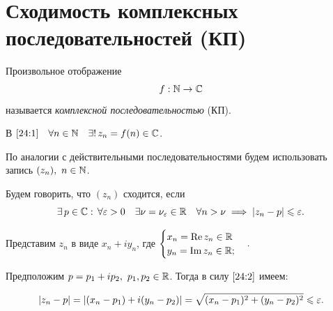 \documentclass[../../main.tex]{subfiles}
\begin{document}
\section{Сходимость комплексных последовательностей (КП)}

Произвольное отображение
\begin{equation}\label{24:1}
f: \mathbb{N} \to \mathbb{C}
\end{equation}
называется \emph{комплексной последовательностью} (КП).

В $ \eqref{24:1} \quad \forall n \in \mathbb{N} \quad \exists!\, z_n = f(n) \in \mathbb{C} 
$.

По аналогии с действительными последовательностями будем использовать запись $ 
(z_n),\ n \in \mathbb{N} $.

Будем говорить, что $ (z_n) $ сходится, если
\begin{equation}\label{24:2}
	\exists\, p \in \mathbb{C} :\, \forall \varepsilon > 0\quad \exists \nu = \nu_\varepsilon \in \mathbb{R} 
	\quad 
	\forall n > \nu \implies |z_n - p| \leqslant \varepsilon.
\end{equation}

Представим $ z_n $ в виде $x_n + i y_n$, где
$\begin{cases}
x_n = \operatorname{Re} z_n \in \mathbb{R} \\
y_n = \operatorname{Im} z_n \in \mathbb{R};
\end{cases}.$

Предположим $ p = p_1 + i p_2,\ p_1, p_2 \in \mathbb{R} $. Тогда в силу $ \eqref{24:2} 
$ имеем:

\begin{equation}\label{24:3}
	|z_n - p| = |(x_n - p_1) + i(y_n - p_2)| = \sqrt{(x_n - p_1)^2 + (y_n - 
	p_2)^2} \leqslant \varepsilon.
\end{equation}
\end{document}
